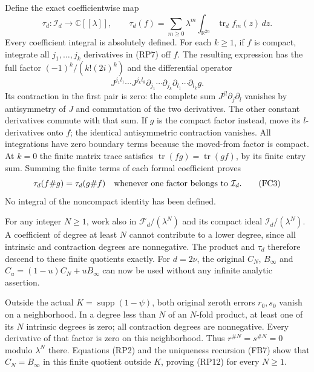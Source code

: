 \documentclass[
  11pt,
]{article}
\begin{document}
Define the exact coefficientwise map \[
 \tau_d:\mathcal I_d\longrightarrow\mathbb C[[\lambda]],
 \qquad
 \tau_d(f)=\sum_{m\ge0}\lambda^m
      \int_{\mathbb R^{2n}}\operatorname{tr}_d f_m(z)\,dz.
 \tag{FC1}
\] Every coefficient integral is absolutely defined. For each \(k\ge1\),
if \(f\) is compact, integrate all \(j_1,\ldots,j_k\) derivatives in
(RP7) off \(f\). The resulting expression has the full factor
\((-1)^k/(k!(2i)^k)\) and the differential operator \[
 J^{j_1l_1}\cdots J^{j_kl_k}
 \partial_{j_1}\cdots\partial_{j_k}
 \partial_{l_1}\cdots\partial_{l_k}g.
 \tag{FC2}
\] Its contraction in the first pair is zero: the complete sum
\(J^{jl}\partial_j\partial_l\) vanishes by antisymmetry of \(J\) and
commutation of the two derivatives. The other constant derivatives
commute with that sum. If \(g\) is the compact factor instead, move its
\(l\)-derivatives onto \(f\); the identical antisymmetric contraction
vanishes. All integrations have zero boundary terms because the
moved-from factor is compact. At \(k=0\) the finite matrix trace
satisfies \(\operatorname{tr}(fg)=\operatorname{tr}(gf)\), by its finite
entry sum. Summing the finite terms of each formal coefficient proves \[
 \tau_d(f\#g)=\tau_d(g\#f)
 \quad\hbox{whenever one factor belongs to }\mathcal I_d.
 \tag{FC3}
\] No integral of the noncompact identity has been defined.

For any integer \(N\ge1\), work also in \(\mathcal F_d/(\lambda^N)\) and
its compact ideal \(\mathcal I_d/(\lambda^N)\). A coefficient of degree
at least \(N\) cannot contribute to a lower degree, since all intrinsic
and contraction degrees are nonnegative. The product and \(\tau_d\)
therefore descend to these finite quotients exactly. For \(d=2\nu\), the
original \(C_N\), \(B_\infty\) and \(C_u=(1-u)C_N+uB_\infty\) can now be
used without any infinite analytic assertion.

Outside the actual \(K=\operatorname{supp}(1-\psi)\), both original
zeroth errors \(r_0,s_0\) vanish on a neighborhood. In a degree less
than \(N\) of an \(N\)-fold product, at least one of its \(N\) intrinsic
degrees is zero; all contraction degrees are nonnegative. Every
derivative of that factor is zero on this neighborhood. Thus
\(r^{\#N}=s^{\#N}=0\) modulo \(\lambda^N\) there. Equations (RP2) and
the uniqueness recursion (FB7) show that \(C_N=B_\infty\) in this finite
quotient outside \(K\), proving (RP12) for every \(N\ge1\).
\end{document}

